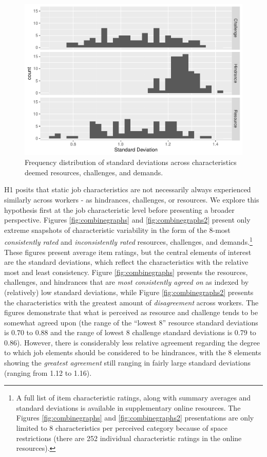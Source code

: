 \documentclass[
  man]{apa7}
\begin{document}
\begin{figure}
\centering
\includegraphics{Submission_files/figure-latex/overallhist-1.pdf}
\caption{\label{fig:overallhist}Frequency distribution of standard deviations across characteristics deemed resources, challenges, and demands.}
\end{figure}

H1 posits that static job characteristics are not necessarily always experienced similarly across workers - as hindrances, challenges, or resources. We explore this hypothesis first at the job characteristic level before presenting a broader perspective. Figures \ref{fig:combinegraphs} and \ref{fig:combinegraphs2} present only extreme snapshots of characteristic variability in the form of the 8-most \emph{consistently rated} and \emph{inconsistently rated} resources, challenges, and demands.\footnote{A full list of item characteristic ratings, along with summary averages and standard deviations is available in supplementary online resources. The Figures \ref{fig:combinegraphs} and \ref{fig:combinegraphs2} presentations are only limited to 8 characteristics per perceived category because of space restrictions (there are 252 individual characteristic ratings in the online resources).} These figures present average item ratings, but the central elements of interest are the standard deviations, which reflect the characteristics with the relative most and least consistency. Figure \ref{fig:combinegraphs} presents the resources, challenges, and hindrances that are \emph{most consistently agreed on} as indexed by (relatively) low standard deviations, while Figure \ref{fig:combinegraphs2} presents the characteristics with the greatest amount of \emph{disagreement} across workers. The figures demonstrate that what is perceived as resource and challenge tends to be somewhat agreed upon (the range of the ``lowest 8'' resource standard deviations is 0.70 to 0.88 and the range of lowest 8 challenge standard deviations is 0.79 to 0.86). However, there is considerably less relative agreement regarding the degree to which job elements should be considered to be hindrances, with the 8 elements showing the \emph{greatest agreement} still ranging in fairly large standard deviations (ranging from 1.12 to 1.16).
\end{document}
